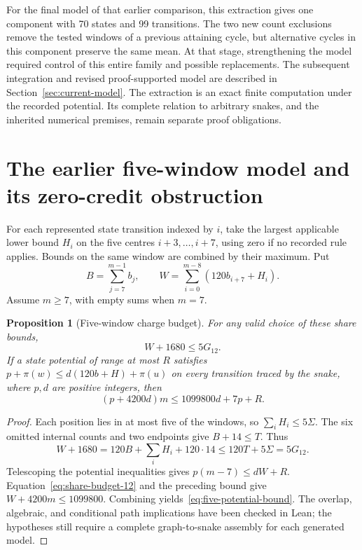 \documentclass[11pt,a4paper]{article}
\newtheorem{proposition}[theorem]{Proposition}
\theoremstyle{definition}
\theoremstyle{remark}
\begin{document}
For the final model of that earlier comparison, this extraction gives one component with 70 states and 99 transitions. The two new count exclusions remove the tested windows of a previous attaining cycle, but alternative cycles in this component preserve the same mean. At that stage, strengthening the model required control of this entire family and possible replacements. The subsequent integration and revised proof-supported model are described in Section~\ref{sec:current-model}. The extraction is an exact finite computation under the recorded potential. Its complete relation to arbitrary snakes, and the inherited numerical premises, remain separate proof obligations.


\section{The earlier five-window model and its zero-credit obstruction}\label{app:earlier-five-model}\label{sec:current-charge}
For each represented state transition indexed by $i$, take the largest applicable lower bound $H_i$ on the five centres $i+3,\ldots,i+7$, using zero if no recorded rule applies. Bounds on the same window are combined by their maximum. Put
\[
B=\sum_{j=7}^{m-1}b_j,\qquad W=\sum_{i=0}^{m-8}(120b_{i+7}+H_i).
\]
Assume $m\ge7$, with empty sums when $m=7$.

\begin{proposition}[Five-window charge budget]\label{prop:five-budget}
For any valid choice of these share bounds,
\[
W+1680\le5G_{12}.
\]
If a state potential of range at most $R$ satisfies $p+\pi(w)\le d(120b+H)+\pi(u)$ on every transition traced by the snake, where $p,d$ are positive integers, then
\begin{equation}\label{eq:five-potential-bound}
(p+4200d)m\le1099800d+7p+R.
\end{equation}
\end{proposition}
\begin{proof}
Each position lies in at most five of the windows, so $\sum_i H_i\le5\Sigma$. The six omitted internal counts and two endpoints give $B+14\le T$. Thus
\[
W+1680=120B+\sum_iH_i+120\cdot14\le120T+5\Sigma=5G_{12}.
\]
Telescoping the potential inequalities gives $p(m-7)\le dW+R$. Equation~\eqref{eq:share-budget-12} and the preceding bound give $W+4200m\le1099800$. Combining yields~\eqref{eq:five-potential-bound}. The overlap, algebraic, and conditional path implications have been checked in Lean; the hypotheses still require a complete graph-to-snake assembly for each generated model.
\end{proof}
\end{document}
